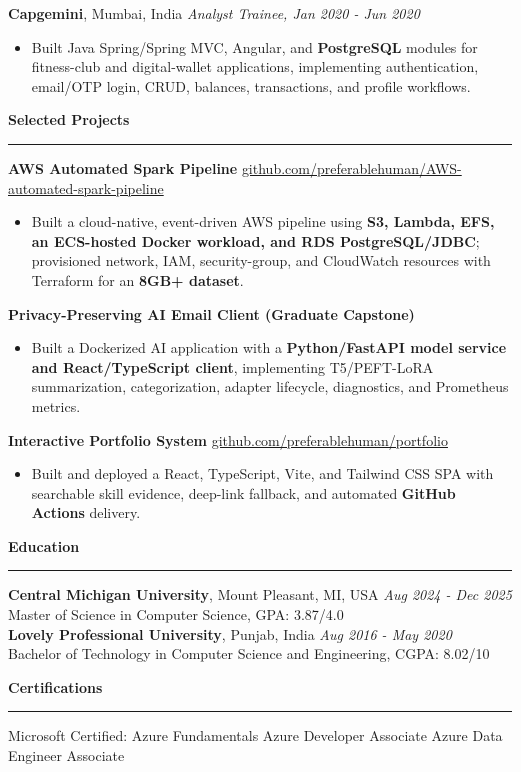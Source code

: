 \documentclass[11pt,letterpaper]{article}
\newcommand{\ressection}[1]{\Needspace{6\baselineskip}\vspace{8pt}\par\textbf{#1}\par\vspace{2pt}\hrule\vspace{5pt}}
\begin{document}
\textbf{Capgemini}, Mumbai, India \hfill \textit{Analyst Trainee, Jan 2020 - Jun 2020}
\begin{itemize}
  \item Built Java Spring/Spring MVC, Angular, and \textbf{PostgreSQL} modules for fitness-club and digital-wallet applications, implementing authentication, email/OTP login, CRUD, balances, transactions, and profile workflows.
\end{itemize}

\ressection{Selected Projects}
\textbf{AWS Automated Spark Pipeline} \hfill \href{https://github.com/preferablehuman/AWS-automated-spark-pipeline}{github.com/preferablehuman/AWS-automated-spark-pipeline}
\begin{itemize}
  \item Built a cloud-native, event-driven AWS pipeline using \textbf{S3, Lambda, EFS, an ECS-hosted Docker workload, and RDS PostgreSQL/JDBC}; provisioned network, IAM, security-group, and CloudWatch resources with Terraform for an \textbf{8GB+ dataset}.
\end{itemize}
\vspace{2pt}
\textbf{Privacy-Preserving AI Email Client (Graduate Capstone)}
\begin{itemize}
  \item Built a Dockerized AI application with a \textbf{Python/FastAPI model service and React/TypeScript client}, implementing T5/PEFT-LoRA summarization, categorization, adapter lifecycle, diagnostics, and Prometheus metrics.
\end{itemize}
\vspace{2pt}
\textbf{Interactive Portfolio System} \hfill \href{https://github.com/preferablehuman/portfolio}{github.com/preferablehuman/portfolio}
\begin{itemize}
  \item Built and deployed a React, TypeScript, Vite, and Tailwind CSS SPA with searchable skill evidence, deep-link fallback, and automated \textbf{GitHub Actions} delivery.
\end{itemize}

\ressection{Education}
\textbf{Central Michigan University}, Mount Pleasant, MI, USA \hfill \textit{Aug 2024 - Dec 2025}\\
Master of Science in Computer Science, GPA: 3.87/4.0\\[2pt]
\textbf{Lovely Professional University}, Punjab, India \hfill \textit{Aug 2016 - May 2020}\\
Bachelor of Technology in Computer Science and Engineering, CGPA: 8.02/10

\ressection{Certifications}
Microsoft Certified: Azure Fundamentals \textbar{} Azure Developer Associate \textbar{} Azure Data Engineer Associate
\end{document}
